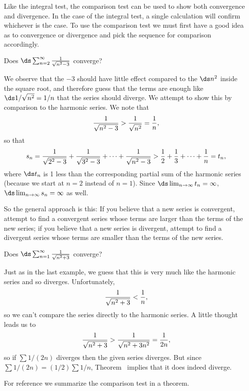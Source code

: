 Like the integral test, the comparison test can be used to show both
convergence and divergence. In the case of the integral test, a single
calculation will confirm whichever is the case. To use the comparison
test we must first have a good idea as to convergence or divergence
and pick the sequence for comparison accordingly.

\begin{example}{}{}
Does $\ds\sum_{n=2}^\infty {1\over\sqrt{n^2-3}}$ converge?
\end{example}
\begin{solution}
We observe that the $-3$ should have little effect compared to the
$\ds n^2$ inside the square root, and therefore guess that the terms are
enough like $\ds 1/\sqrt{n^2}=1/n$ that the series should diverge. We
attempt to show this by comparison to the harmonic series. We note
that 
$${1\over\sqrt{n^2-3}} > {1\over\sqrt{n^2}} = {1\over n},$$
so that
$$
  s_n={1\over\sqrt{2^2-3}}+{1\over\sqrt{3^2-3}}+\cdots+
  {1\over\sqrt{n^2-3}} > {1\over 2} + {1\over3}+\cdots+{1\over n}=t_n,
$$
where $\ds t_n$ is 1 less than the corresponding partial sum of the
harmonic series (because we start at $n=2$ instead of $n=1$). Since
$\ds\lim_{n\to\infty}t_n=\infty$, $\ds\lim_{n\to\infty}s_n=\infty$ as
well.
\end{solution}

So the general approach is this: If you believe that a new series is
convergent, attempt to find a convergent series whose terms are
larger than the terms of the new series; if you believe that a new
series is divergent, attempt to find a divergent series whose terms
are smaller than the terms of the new series.

\begin{example}{}{}
Does $\ds\sum_{n=1}^\infty {1\over\sqrt{n^2+3}}$ converge?
\end{example}
\begin{solution}
Just as in the last example, we guess that this is very much like the
harmonic series and so diverges. Unfortunately,
$${1\over\sqrt{n^2+3}} < {1\over n},$$
so we can't compare the series directly to the harmonic series.
A little thought leads us to
$${1\over\sqrt{n^2+3}} > {1\over\sqrt{n^2+3n^2}} = {1\over2n},$$ so if
$\sum 1/(2n)$ diverges then the given series diverges. But since $\sum
1/(2n)=(1/2)\sum 1/n$, Theorem~ implies
that it does indeed diverge.
\end{solution}

For reference we summarize the comparison test in a theorem.

